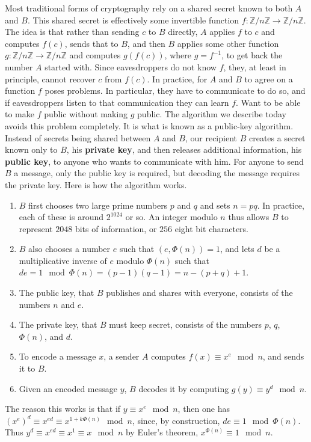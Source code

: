 \documentclass{article}
\newcommand{\Z}{\mathbb{Z}}
\newcommand{\rb}[1]{\left( #1 \right)}
\theoremstyle{definition}\newtheorem{definition}{Definition}
\theoremstyle{definition}\newtheorem*{remark}{Remark}
\theoremstyle{definition}\newtheorem*{example}{Example}
\theoremstyle{definition}\newtheorem*{note}{Note}
\begin{document}
Most traditional forms of cryptography rely on a shared secret known to both $ A $ and $ B $. This shared secret is effectively some invertible function $ f : \Z / n\Z \to \Z / n\Z $. The idea is that rather than sending $ c $ to $ B $ directly, $ A $ applies $ f $ to $ c $ and computes $ f\rb{c} $, sends that to $ B $, and then $ B $ applies some other function $ g : \Z / n\Z \to \Z / n\Z $ and computes $ g\rb{f\rb{c}} $, where $ g = f^{-1} $, to get back the number $ A $ started with. Since eavesdroppers do not know $ f $, they, at least in principle, cannot recover $ c $ from $ f\rb{c} $. In practice, for $ A $ and $ B $ to agree on a function $ f $ poses problems. In particular, they have to communicate to do so, and if eavesdroppers listen to that communication they can learn $ f $. Want to be able to make $ f $ public without making $ g $ public. The algorithm we describe today avoids this problem completely. It is what is known as a public-key algorithm. Instead of secrets being shared between $ A $ and $ B $, our recipient $ B $ creates a secret known only to $ B $, his \textbf{private key}, and then releases additional information, his \textbf{public key}, to anyone who wants to communicate with him. For anyone to send $ B $ a message, only the public key is required, but decoding the message requires the private key. Here is how the algorithm works.
\begin{enumerate}
\item $ B $ first chooses two large prime numbers $ p $ and $ q $ and sets $ n = pq $. In practice, each of these is around $ 2^{1024} $ or so. An integer modulo $ n $ thus allows $ B $ to represent $ 2048 $ bits of information, or $ 256 $ eight bit characters.
\item $ B $ also chooses a number $ e $ such that $ \rb{e, \Phi\rb{n}} = 1 $, and lets $ d $ be a multiplicative inverse of $ e $ modulo $ \Phi\rb{n} $ such that $ de = 1 \mod \Phi\rb{n} = \rb{p - 1}\rb{q - 1} = n - \rb{p + q} + 1 $.
\item The public key, that $ B $ publishes and shares with everyone, consists of the numbers $ n $ and $ e $.
\item The private key, that $ B $ must keep secret, consists of the numbers $ p $, $ q $, $ \Phi\rb{n} $, and $ d $.
\item To encode a message $ x $, a sender $ A $ computes $ f\rb{x} \equiv x^e \mod n $, and sends it to $ B $.
\item Given an encoded message $ y $, $ B $ decodes it by computing $ g\rb{y} \equiv y^d \mod n $.
\end{enumerate}
The reason this works is that if $ y \equiv x^e \mod n $, then one has $ \rb{x^e}^d \equiv x^{ed} \equiv x^{1 + k\Phi\rb{n}} \mod n $, since, by construction, $ de \equiv 1 \mod \Phi\rb{n} $. Thus $ y^d \equiv x^{ed} \equiv x^1 \equiv x \mod n $ by Euler's theorem, $ x^{\Phi\rb{n}} \equiv 1 \mod n $.
\end{document}
